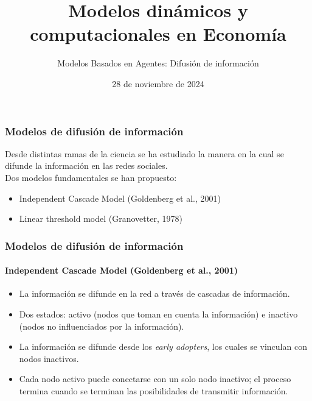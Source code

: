 \documentclass[11pt]{beamer}
\begin{document}
	\title{Modelos dinámicos y computacionales en Economía}
	\subtitle{Modelos Basados en Agentes: Difusión de información}
	\date{28 de noviembre de 2024}




\begin{frame}
	\frametitle{Modelos de difusión de información}
	Desde distintas ramas de la ciencia se ha estudiado la manera en la cual se difunde la información en las redes sociales.\\
	Dos modelos fundamentales se han propuesto:
	\begin{itemize}
		\item Independent Cascade Model (Goldenberg et al., 2001)
		\item Linear threshold model (Granovetter, 1978)
	\end{itemize}
\end{frame}

\begin{frame}
	\frametitle{Modelos de difusión de información}
	\framesubtitle{Independent Cascade Model (Goldenberg et al., 2001)}
	\begin{itemize}
			\item La información se difunde en la red a través de cascadas de información.
			\item Dos estados: activo (nodos que toman en cuenta la información) e inactivo (nodos no influenciados por la información).
			\item La información se difunde desde los \textit{early adopters}, los cuales se vinculan con nodos inactivos.
			\item Cada nodo activo puede conectarse con un solo nodo inactivo; el proceso termina cuando se terminan las posibilidades de transmitir información.
	\end{itemize}
\end{frame}
\end{document}
